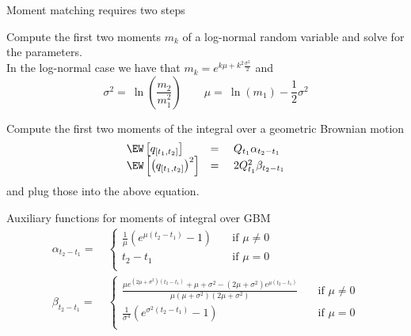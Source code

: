 

{Moment matching requires two steps}

	Compute the first two moments $m_k$ of a log-normal random variable and solve for the parameters. \\
     In the log-normal case we have that $m_k = e^{k\mu + k^2 \frac{\sigma^2}{2}}$ and
     $$
     \sigma^2 = \ \ln\left( \frac{m_2}{m^2_1}\right)  \qquad \mu = \ \ln(m_1) - \frac{1}{2}  \sigma^2
     $$

	Compute the first two moments of the integral over a geometric Brownian motion
    $$\begin{array}{lll}
\EW \left[ q_{[t_1,t_2]} \right] &=& \ Q_{t_1} \alpha_{t_2-t_1} \\
\EW \left[ \left( q_{[t_1,t_2]} \right)^2 \right] &=& \ 2 Q_{t_1}^2 \beta_{t_2-t_1}
\end{array}
$$
    and plug those into the above equation.

{Auxiliary functions for moments of integral over GBM}
\begin{align}
\alpha_{t_2-t_1}    =& \ \left\{
         \begin{array}{ll}
            \frac{1}{\mu} \left( e^{\mu \left( t_2 - t_1 \right)} - 1 \right)
            & \quad \mbox{if $\mu \ne 0$} \\
            t_2 - t_1
            & \quad \mbox{if $\mu = 0$} \\
         \end{array} \right. \label{MomIntAlpha} \\
\beta_{t_2-t_1}    =& \ \left\{
         \begin{array}{ll}
            \frac{ \mu e^{(2 \mu + \sigma^2) \left( t_2 - t_1 \right)} + \mu + \sigma^2 - \left( 2\mu + \sigma^2\right) e^{\mu \left( t_2 - t_1 \right)}}{\mu(\mu + \sigma^2)(2\mu + \sigma^2)}
            & \quad \mbox{if $\mu \ne 0$} \\
            \frac{1}{\sigma^4} \left( e^{\sigma^2\left(t_2-t_1\right)} - 1\right)
            & \quad \mbox{if $\mu = 0$} \\
         \end{array} \right. \label{MomIntBeta}
\end{align}

